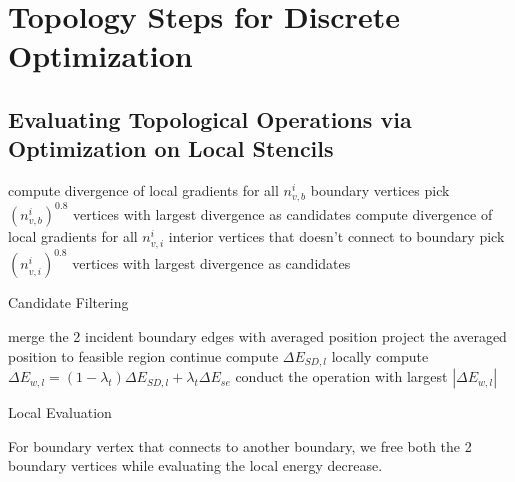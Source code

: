 \section{Topology Steps for Discrete Optimization}
\label{sec:topologyStep}

\subsection{Evaluating Topological Operations via Optimization on Local Stencils}

\begin{algorithm}[h]
\SetAlgoLined
{}
{
  compute divergence of local gradients for all $n_{v,b}^i$ boundary vertices\;
  pick $(n_{v,b}^i)^{0.8}$ vertices with largest divergence as candidates\;
}
{
  compute divergence of local gradients for all $n_{v,i}^i$ interior vertices that doesn't connect to boundary\;
  pick $(n_{v,i}^i)^{0.8}$ vertices with largest divergence as candidates\;
}
\caption{Candidate Filtering}
\end{algorithm}

\begin{algorithm}[h]
\SetAlgoLined
{}
{
  {
    merge the 2 incident boundary edges with averaged position\;
    {
      project the averaged position to feasible region\;
      {
        continue\;
      }
    }
    compute $\Delta E_{SD,l}$ locally\;
    compute $\Delta E_{w,l} = (1-\lambda_t)\Delta E_{SD,l}+\lambda_t \Delta E_{se}$
  }
}
conduct the operation with largest $|\Delta E_{w,l}|$
\caption{Local Evaluation}
\end{algorithm}
For boundary vertex that connects to another boundary, we free both the 2 boundary vertices while evaluating the local energy decrease.


